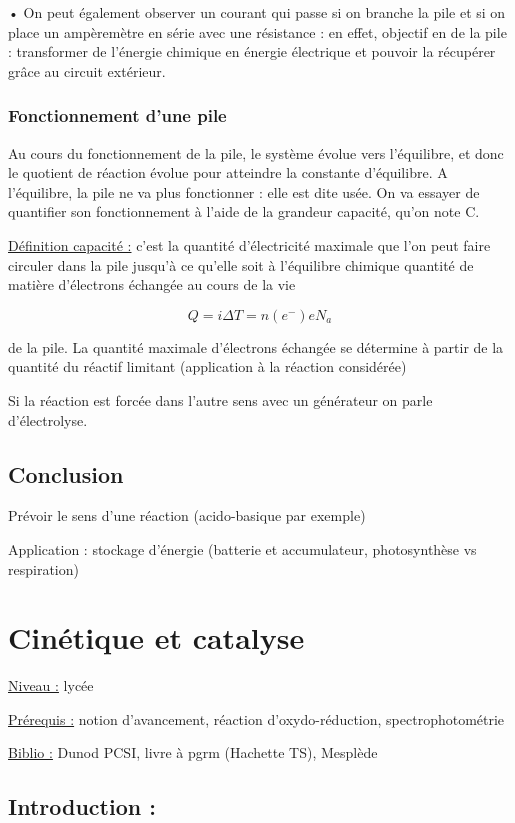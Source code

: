\documentclass{article}%
\begin{document}
• On peut également observer un courant qui passe si on branche la pile et si on place un
ampèremètre en série avec une résistance : en effet, objectif en de la pile : transformer de
l’énergie chimique en énergie électrique et pouvoir la récupérer grâce au circuit extérieur.

\subsubsection{Fonctionnement d'une pile}

Au cours du fonctionnement de la pile, le système évolue vers l’équilibre, et donc le quotient de
réaction évolue pour atteindre la constante d’équilibre. A l’équilibre, la pile ne va plus fonctionner :
elle est dite usée. On va essayer de quantifier son fonctionnement à l’aide de la grandeur capacité,
qu’on note C.

\underline{Définition capacité :} c’est la quantité d’électricité maximale que l’on peut faire circuler dans la pile
jusqu’à ce qu’elle soit à l’équilibre chimique
quantité de matière d’électrons échangée au cours de la vie

\[Q=i\Delta T= n(e^{-})e N_a\]

de la pile. La quantité maximale d’électrons échangée se détermine à partir de la quantité du réactif
limitant (application à la réaction considérée)

Si la réaction est forcée dans l'autre sens avec un générateur on parle d'électrolyse.

\subsection{Conclusion}

Prévoir le sens d'une réaction (acido-basique par exemple)

Application : stockage d'énergie (batterie et accumulateur, photosynthèse vs respiration)


\section{Cinétique et catalyse}
\underline{Niveau :} lycée

\underline{Prérequis :} notion d'avancement, réaction d'oxydo-réduction, spectrophotométrie

\underline{Biblio :} Dunod PCSI, livre à pgrm (Hachette TS), Mesplède 

\subsection{Introduction :}
\end{document}
